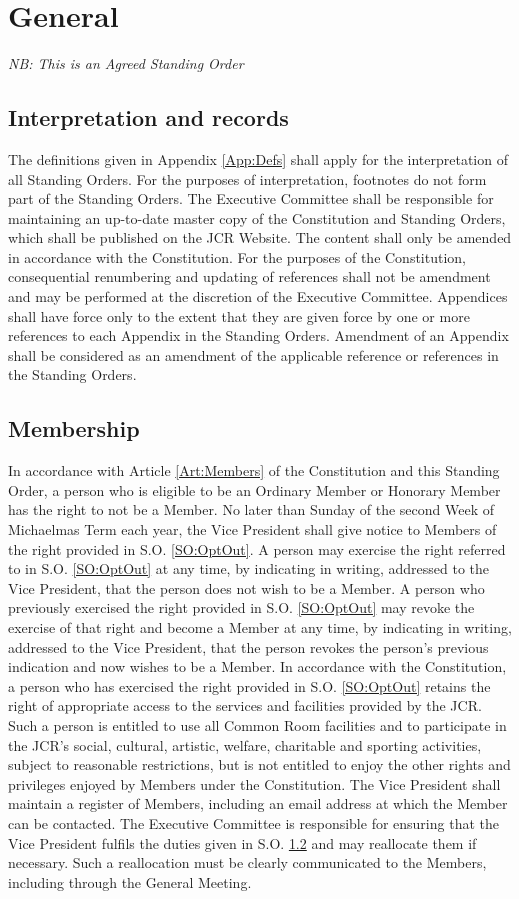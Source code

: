 \chapter{General}
\textit{NB: This is an Agreed Standing Order}
\section{Interpretation and records}
\npara The definitions given in Appendix \ref{App:Defs} shall apply for the interpretation of all Standing Orders.
For the purposes of interpretation, footnotes do not form part of the Standing Orders.
\npara The Executive Committee shall be responsible for maintaining an up-to-date master copy of the Constitution and Standing Orders, which shall be published on the JCR Website.
The content shall only be amended in accordance with the Constitution.
\npara For the purposes of the Constitution, consequential renumbering and updating of references shall not be amendment and may be performed at the discretion of the Executive Committee.
\npara \label{SO:appendices} Appendices shall have force only to the extent that they are given force by one or more references to each Appendix in the Standing Orders.  Amendment of an Appendix shall be considered as an amendment of the applicable reference or references in the Standing Orders.
\section{Membership} \label{SO:Membership}
\npara \label{SO:OptOut} In accordance with Article \ref{Art:Members} of the Constitution and this Standing Order, a person who is eligible to be an Ordinary Member or Honorary Member has the right to not be a Member.
\npara No later than Sunday of the second Week of Michaelmas Term each year, the Vice President shall give notice to Members of the right provided in S.O. \ref{SO:OptOut}.
\npara A person may exercise the right referred to in S.O. \ref{SO:OptOut} at any time, by indicating in writing, addressed to the Vice President, that the person does not wish to be a Member.
\npara A person who previously exercised the right provided in S.O. \ref{SO:OptOut} may revoke the exercise of that right and become a Member at any time, by indicating in writing, addressed to the Vice President, that the person revokes the person's previous indication and now wishes to be a Member.
\npara In accordance with the Constitution, a person who has exercised the right provided in S.O. \ref{SO:OptOut} retains the right of appropriate access to the services and facilities provided by the JCR.
Such a person is entitled to use all Common Room facilities and to participate in the JCR's social, cultural, artistic, welfare, charitable and sporting activities, subject to reasonable restrictions, but is not entitled to enjoy the other rights and privileges enjoyed by Members under the Constitution.
\npara The Vice President shall maintain a register of Members, including an email address at which the Member can be contacted.
\npara The Executive Committee is responsible for ensuring that the Vice President fulfils the duties given in S.O. \ref{SO:Membership} and may reallocate them if necessary.
Such a reallocation must be clearly communicated to the Members, including through the General Meeting.
